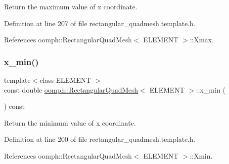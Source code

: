 Return the maximum value of x coordinate. 



Definition at line 207 of file rectangular\+\_\+quadmesh.\+template.\+h.



References oomph\+::\+Rectangular\+Quad\+Mesh$<$ E\+L\+E\+M\+E\+N\+T $>$\+::\+Xmax.

\mbox{\label{classoomph_1_1RectangularQuadMesh_ab311c3bec7f9f721bae1f93e0798ab2c}} 
\subsubsection{\texorpdfstring{x\+\_\+min()}{x\_min()}}
{\footnotesize\ttfamily template$<$class E\+L\+E\+M\+E\+NT $>$ \\
const double \hyperlink{classoomph_1_1RectangularQuadMesh}{oomph\+::\+Rectangular\+Quad\+Mesh}$<$ E\+L\+E\+M\+E\+NT $>$\+::x\+\_\+min (\begin{DoxyParamCaption}{ }\end{DoxyParamCaption}) const\hspace{0.3cm}{\ttfamily [inline]}}



Return the minimum value of x coordinate. 



Definition at line 200 of file rectangular\+\_\+quadmesh.\+template.\+h.



References oomph\+::\+Rectangular\+Quad\+Mesh$<$ E\+L\+E\+M\+E\+N\+T $>$\+::\+Xmin.

\mbox{\label{classoomph_1_1RectangularQuadMesh_ad4c2f349cf201cb3107f0a4e5447c16f}} 
